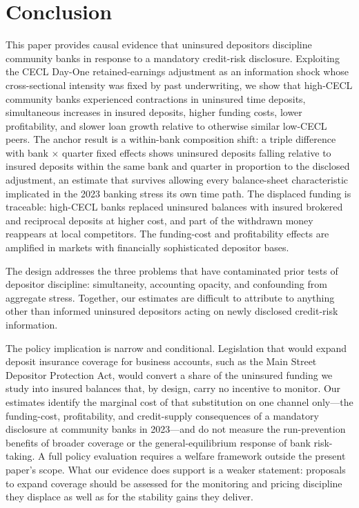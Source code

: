 \section{Conclusion}
\label{sec:conclusion}

This paper provides causal evidence that uninsured depositors discipline
community banks in response to a mandatory credit-risk disclosure.
Exploiting the CECL Day-One retained-earnings adjustment as an
information shock whose cross-sectional intensity was fixed by past
underwriting, we show that high-CECL community banks experienced
contractions in uninsured time deposits, simultaneous increases in
insured deposits, higher funding costs, lower profitability, and slower
loan growth relative to otherwise similar low-CECL peers.  The anchor
result is a within-bank composition shift: a triple difference with
bank $\times$ quarter fixed effects shows uninsured deposits falling
relative to insured deposits within the same bank and quarter in
proportion to the disclosed adjustment, an estimate that survives
allowing every balance-sheet characteristic implicated in the 2023
banking stress its own time path.  The displaced funding is traceable:
high-CECL banks replaced uninsured balances with insured brokered and
reciprocal deposits at higher cost, and part of the withdrawn money
reappears at local competitors.  The funding-cost and profitability
effects are amplified in markets with financially sophisticated
depositor bases.

The design addresses the three problems that have contaminated prior
tests of depositor discipline: simultaneity, accounting opacity, and
confounding from aggregate stress.  Together, our estimates are
difficult to attribute to anything other than informed uninsured
depositors acting on newly disclosed credit-risk information.

The policy implication is narrow and conditional.  Legislation that
would expand deposit insurance coverage for business accounts, such as
the Main Street Depositor Protection Act, would convert a share of the
uninsured funding we study into insured balances that, by design, carry
no incentive to monitor.  Our estimates identify the marginal cost of
that substitution on one channel only---the funding-cost, profitability,
and credit-supply consequences of a mandatory disclosure at community
banks in 2023---and do not measure the run-prevention benefits of
broader coverage or the general-equilibrium response of bank risk-taking.
A full policy evaluation requires a welfare framework outside the
present paper's scope.  What our evidence does support is a weaker
statement: proposals to expand coverage should be assessed for the
monitoring and pricing discipline they displace as well as for the
stability gains they deliver.
